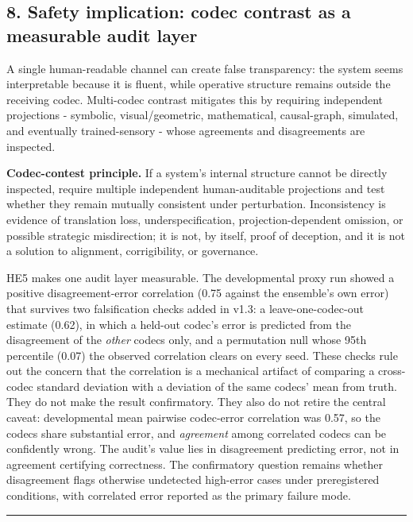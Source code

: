 \documentclass[
  11pt,
]{article}
\begin{document}
\subsection{8. Safety implication: codec
contrast as a measurable audit
layer}\label{safety-implication-codec-contrast-as-a-measurable-audit-layer}

A single human-readable channel can create false
transparency: the system seems interpretable
because it is fluent, while operative structure
remains outside the receiving codec. Multi-codec
contrast mitigates this by requiring independent
projections - symbolic, visual/geometric,
mathematical, causal-graph, simulated, and
eventually trained-sensory - whose agreements
and disagreements are inspected.

\textbf{Codec-contest principle.} If a system's
internal structure cannot be directly inspected,
require multiple independent human-auditable
projections and test whether they remain
mutually consistent under perturbation.
Inconsistency is evidence of translation loss,
underspecification, projection-dependent
omission, or possible strategic misdirection; it
is not, by itself, proof of deception, and it is
not a solution to alignment, corrigibility, or
governance.

HE5 makes one audit layer measurable. The
developmental proxy run showed a positive
disagreement-error correlation (0.75 against the
ensemble's own error) that survives two
falsification checks added in v1.3: a
leave-one-codec-out estimate (0.62), in which a
held-out codec's error is predicted from the
disagreement of the \emph{other} codecs only,
and a permutation null whose 95th percentile
(0.07) the observed correlation clears on every
seed. These checks rule out the concern that the
correlation is a mechanical artifact of
comparing a cross-codec standard deviation with
a deviation of the same codecs' mean from truth.
They do not make the result confirmatory. They
also do not retire the central caveat:
developmental mean pairwise codec-error
correlation was 0.57, so the codecs share
substantial error, and \emph{agreement} among
correlated codecs can be confidently wrong. The
audit's value lies in disagreement predicting
error, not in agreement certifying correctness.
The confirmatory question remains whether
disagreement flags otherwise undetected
high-error cases under preregistered conditions,
with correlated error reported as the primary
failure mode.

\begin{center}\rule{0.5\linewidth}{0.5pt}\end{center}
\end{document}
